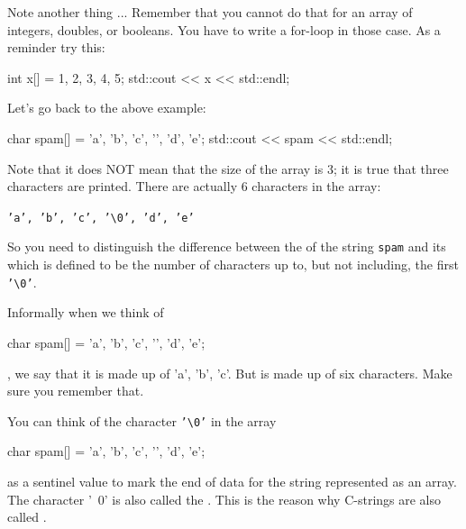 Note another thing ...  Remember that you cannot do that for an array of integers, doubles, or booleans. You have to write a for-loop in those case. As a reminder try this:

\begin{consolethree}[escapeinside=||]
int x[] = {1, 2, 3, 4, 5};
std::cout << x << std::endl;
\end{consolethree}

Let's go back to the above example:

\begin{consolethree}[escapeinside=||]
char spam[] = {'a', 'b', 'c', '\0', 'd', 'e'};
std::cout << spam << std::endl;
\end{consolethree}

Note that it does NOT mean that the size of the array is 3; it is true that three characters are printed. There are actually 6 characters in the array:

\begin{center}
\texttt{'a', 'b', 'c', \texttt{'\textbackslash 0'}, 'd', 'e'}
\end{center}

So you need to distinguish the difference between the  of the string \texttt{spam} and its  which is defined to be the number of characters up to, but not including, the first \texttt{'\textbackslash 0'}.

Informally when we think of

\begin{consolethree}[escapeinside=||]
char spam[] = {'a', 'b', 'c', '\0', 'd', 'e'};
\end{consolethree}

, we say that it is made up of 'a', 'b', 'c'. But  is made up of six characters. Make sure you remember that.

You can think of the character \texttt{'\textbackslash 0'} in the array

\begin{consolethree}[escapeinside=||]
char spam[] = {'a', 'b', 'c', '\0', 'd', 'e'};
\end{consolethree}

as a sentinel value to mark the end of data for the string represented as an array. The character '\ 0' is also called the . This is the reason why C-strings are also called .

